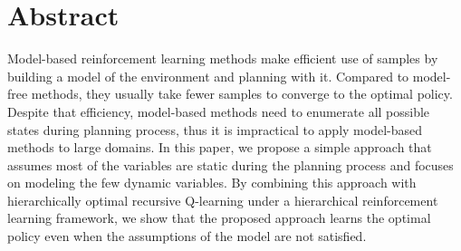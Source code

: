 






\chapter{Abstract}

Model-based reinforcement learning methods make efficient use of samples by 
building a model of the environment and planning with it.
Compared to model-free methods, they usually take fewer samples to converge to the optimal policy.
Despite that efficiency, model-based methods
need to enumerate all possible states during planning process,
thus it is impractical to apply model-based methods to large domains.
In this paper, we propose a simple approach that assumes most of the variables 
are static during the planning process and focuses on modeling the few dynamic variables.
By combining this approach with 
hierarchically optimal recursive Q-learning under 
a hierarchical reinforcement learning framework, we show that
the proposed approach learns the optimal policy even when
the assumptions of the model are not satisfied.

\vfill
\begin{center}
\begin{sf}
\end{sf}
\end{center}

